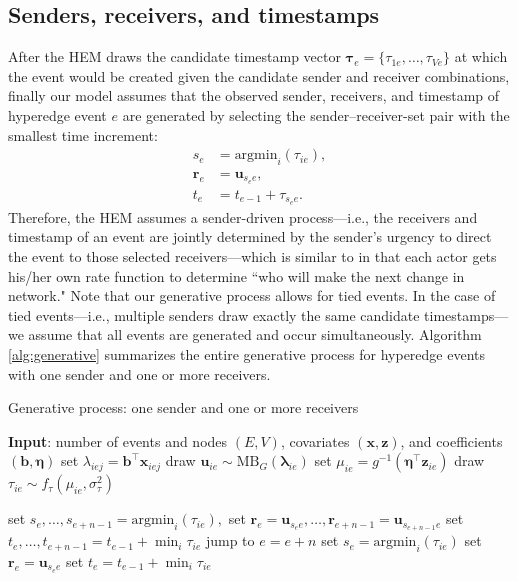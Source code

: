 \documentclass[ba]{imsart}
\def\spacingset#1{\renewcommand{\baselinestretch}%
	{#1}\small\normalsize} \spacingset{1}
\numberwithin{equation}{section}
\theoremstyle{plain}
\begin{document}
	\subsection{Senders, receivers, and timestamps}\label{subsec:Observed}
		After the HEM draws the candidate timestamp vector $\boldsymbol{\tau}_e=\{\tau_{1e},\ldots,\tau_{Ve}\}$ at which the event would be created given the candidate sender and receiver combinations, finally our model assumes that the observed sender, receivers, and timestamp of hyperedge event $e$ are generated by selecting the sender--receiver-set pair with the smallest time increment:
	\begin{equation}
		\begin{aligned}
			s_e &= \mbox{argmin}_{i}(\tau_{ie}),\\
			\boldsymbol{r}_e &= \boldsymbol{u}_{s_e e},\\
			t_e &=t_{e-1} + \tau_{s_e e}.
		\end{aligned}
	\end{equation}
		Therefore, the HEM assumes a sender-driven process---i.e., the receivers and timestamp of an event are jointly determined by the sender's urgency to direct the event to those selected receivers---which is similar to \cite{snijders1996stochastic} in that each actor gets his/her own rate function to determine ``who will make the next change in network." Note that our generative process allows for tied events. In the case of tied events---i.e., multiple senders draw exactly the same candidate timestamps---we assume that all events are generated and occur simultaneously. Algorithm \ref{alg:generative} summarizes the entire generative process for hyperedge events with one sender and one or more receivers.     ~	
			\begin{algorithm}[!t]
				\spacingset{1}
				\SetAlgoLined
				\caption{Generative process: one sender and one or more receivers}
				\begin{algorithmic}
					\STATE \textbf{Input}: number of events and nodes $(E, V)$, covariates $(\boldsymbol{x}, \boldsymbol{z})$, and coefficients $(\boldsymbol{b}, \boldsymbol{\eta})$
					\vskip 0.1in
					\STATE	set $\lambda_{iej} = {\boldsymbol{b}}^{\top}\boldsymbol{x}_{iej}$
					\ENDFOR
					\STATE	draw $\boldsymbol{u}_{ie}  \sim
					\mbox{MB}_G(\boldsymbol{\lambda}_{ie})$
					\STATE		set $\mu_{ie} = g^{-1}(\boldsymbol{\eta}^\top \boldsymbol{z}_{ie})$
					\STATE		draw $\tau_{ie} \sim f_\tau(\mu_{ie}, \sigma_\tau^2)$
					\ENDFOR
					
					\STATE	set $s_e,\ldots, s_{e+n-1}=\mbox{argmin}_{i}(\tau_{ie}),$
					\STATE	set $\boldsymbol{r}_e=\boldsymbol{u}_{s_e e},\ldots,\boldsymbol{r}_{e+n-1}=\boldsymbol{u}_{s_{e+n-1} e}$
					\STATE	set $t_e, \ldots, t_{e+n-1}=t_{e-1} + \min_i\tau_{ie}$
					\STATE		jump to $e = e+n$
					\ELSE
					\STATE	set $s_e= \mbox{argmin}_{i}(\tau_{ie})$
					\STATE		set $\boldsymbol{r}_e = \boldsymbol{u}_{s_e e}$
					\STATE	set $t_e =t_{e-1} + \min_i\tau_{ie}$
					\ENDIF
					\ENDFOR
				\end{algorithmic}
				\label{alg:generative}
			\end{algorithm}
\end{document}

